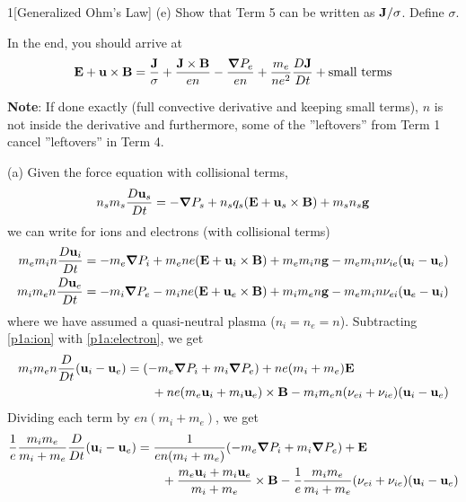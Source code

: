 \documentclass[12pt]{article}
\begin{document}
\begin{problem}{1}[Generalized Ohm's Law]
(e) Show that Term 5 can be written as $\vb{J}/\sigma$. Define $\sigma$.

In the end, you should arrive at
\begin{equation}
    \vb{E}+\vb{u}\times\vb{B}=\frac{\vb{J}}{\sigma}+\frac{\vb{J}\times\vb{B}}{en}-\frac{\grad
    P_e}{en}+\frac{m_e}{ne^2}\frac{D\vb{J}}{Dt}+\text{small terms} 
\end{equation}

\textbf{Note}: If done exactly (full convective derivative and keeping small
terms), $n$ is not inside the derivative and furthermore, some of the
''leftovers'' from Term 1 cancel ''leftovers'' in Term 4.
\begin{solution}
(a) Given the force equation with collisional terms,
\begin{equation}
    n_sm_s\frac{D\vb{u}_s}{Dt}=-\grad P_s+n_sq_s(\vb{E}+\vb{u}_s\times\vb{B})
    +m_sn_s\vb{g}
\end{equation}
we can write for ions and electrons (with collisional terms)
\begin{subequations}
    \begin{align}
        m_em_in\frac{D\vb{u}_i}{Dt}&=-m_e\grad
        P_i+m_ene(\vb{E}+\vb{u}_i\times\vb{B})+m_em_in\vb{g}
        -m_em_in\nu_{ie}(\vb{u}_i-\vb{u}_e)\label{p1a:ion}\\
        m_im_en\frac{D\vb{u}_e}{Dt}&=-m_i\grad
        P_e-m_ine(\vb{E}+\vb{u}_e\times\vb{B})+m_im_en\vb{g}
        -m_em_in\nu_{ei}(\vb{u}_e-\vb{u}_i)\label{p1a:electron}
    \end{align} 
\end{subequations}
where we have assumed a quasi-neutral plasma ($n_i=n_e=n$). Subtracting 
\eqref{p1a:ion} with \eqref{p1a:electron}, we get
\begin{align}
    m_im_en\frac{D}{Dt}(\vb{u}_i-\vb{u}_e)
    &=\qty(-m_e\grad P_i+m_i\grad P_e)+ne(m_i+m_e)\vb{E}\notag\\
    &\qquad+ne(m_e\vb{u}_i+m_i\vb{u}_e)\times\vb{B}
    -m_im_en(\nu_{ei}+\nu_{ie})(\vb{u}_i-\vb{u}_e)
\end{align}
Dividing each term by $en(m_i+m_e)$, we get
\begin{align}
    \frac1e\frac{m_im_e}{m_i+m_e}\frac{D}{Dt}(\vb{u}_i-\vb{u}_e)
    &=\frac1{en(m_i+m_e)}\qty(-m_e\grad P_i+m_i\grad P_e)+\vb{E}\notag\\
    &\qquad+\frac{m_e\vb{u}_i+m_i\vb{u}_e}{m_i+m_e}\times\vb{B}
    -\frac1e\frac{m_im_e}{m_i+m_e}(\nu_{ei}+\nu_{ie})(\vb{u}_i-\vb{u}_e)
\end{align}



\end{solution}
\end{problem}
\end{document}
